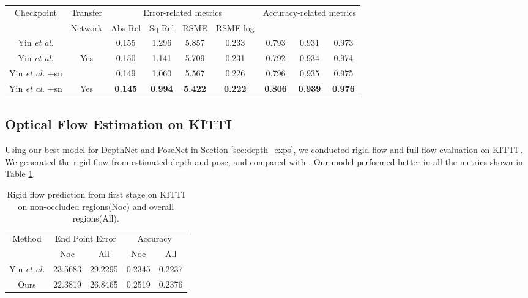 \documentclass[10pt,twocolumn]{article}
\begin{document}
\begin{table*}[htbp]
\centering
\begin{tabular}{ c c|| c c c c|c c c  }
 \hline
  \multirow{2}{*}{Checkpoint} & 
  Transfer & \multicolumn{4}{c|}{Error-related metrics} & \multicolumn{3}{c}{Accuracy-related metrics}\\
  
   & Network & Abs Rel & Sq Rel & RSME & RSME log &  &  & \\
   
 \hline
  Yin \textit{et al.} \cite{yin2018geonet} &  &   0.155 & 1.296 & 5.857 & 0.233 & 0.793 & 0.931 & 0.973 \\

  Yin \textit{et al.} \cite{yin2018geonet} &  Yes  & 0.150 & 1.141 & 5.709 & 0.231 & 0.792 & 0.934 & 0.974 \\
  
  Yin \textit{et al.} \cite{yin2018geonet} +sn &  &   0.149 &    1.060 &    5.567    & 0.226 & 0.796 & 0.935 & 0.975 \\

  Yin \textit{et al.} \cite{yin2018geonet} +sn &  Yes  & \textbf{0.145} & \textbf{0.994} & \textbf{5.422} & \textbf{0.222} & \textbf{0.806} & \textbf{0.939} & \textbf{0.976} \\
 \hline
\end{tabular}
\caption{Gains in depth prediction using our proposed Transfer Network. (\textbf{+sn}: ``using scale normalization".)}\label{tab:transfer}

\end{table*}

\subsection{Optical Flow Estimation on KITTI}
Using our best model for DepthNet and PoseNet in Section \ref{sec:depth_exps}, we conducted rigid flow  and full flow evaluation on KITTI \cite{geiger2012we}. We generated the rigid flow from estimated depth and pose, and compared with \cite{yin2018geonet}. Our model performed better in all the metrics shown in Table \ref{tab:flow}. 
\begin{table}[htbp]
\centering
\begin{tabular}{ c || c c|c c  }
 \hline
    \multirow{2}{*}{Method}&
  \multicolumn{2}{c|}{End Point Error} & \multicolumn{2}{c}{Accuracy}\\
   &  Noc & All & Noc & All\\
 \hline
  Yin \textit{et al.} \cite{yin2018geonet} & 23.5683 & 29.2295 & 0.2345 & 0.2237 \\
  \hline
  Ours   & 22.3819 & 26.8465 & 0.2519 & 0.2376 \\
 \hline
\end{tabular}
\caption{Rigid flow prediction from first stage on KITTI on non-occluded regions(Noc) and overall regions(All).}\label{tab:flow}
\end{table}
\end{document}
